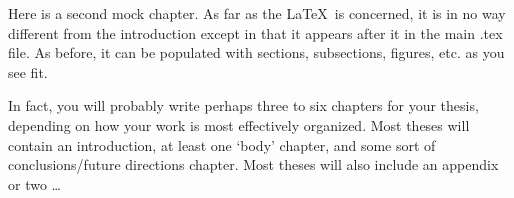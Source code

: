 
Here is a second mock chapter.  As far as the \LaTeX ~is concerned, it is in no way different from the introduction except in that it appears after it in the main .tex file.  As before, it can be populated with sections, subsections, figures, etc. as you see fit.

In fact, you will probably write perhaps three to six chapters for your thesis, depending on how your work is most effectively organized.  Most theses will contain an introduction, at least one `body' chapter, and some sort of conclusions/future directions chapter.  Most theses will also include an appendix or two \ldots


